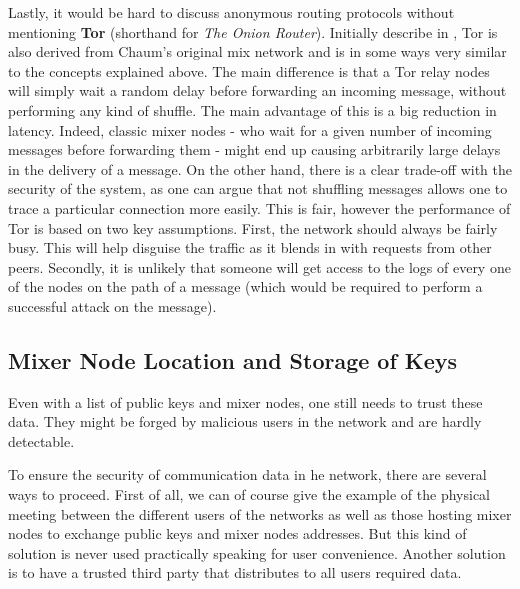 \documentclass[11pt, a4paper]{article}
\begin{document}
        \bigbreak
        Lastly, it would be hard to discuss anonymous routing protocols without mentioning \textbf{Tor} (shorthand for \textit{The Onion Router}).
        Initially describe in \cite{tor}, Tor is also derived from Chaum's original mix network and is in some ways very similar to the concepts explained above.
        The main difference is that a Tor relay nodes will simply wait a random delay before forwarding an incoming message, without performing any kind of shuffle.
        The main advantage of this is a big reduction in latency.
        Indeed, classic mixer nodes - who wait for a given number of incoming messages before forwarding them - might end up causing arbitrarily large delays in the delivery of a message.
        On the other hand, there is a clear trade-off with the security of the system, as one can argue that not shuffling messages allows one to trace a particular connection more easily.
        This is fair, however the performance of Tor is based on two key assumptions.
        First, the network should always be fairly busy.
        This will help disguise the traffic as it blends in with requests from other peers.
        Secondly, it is unlikely that someone will get access to the logs of every one of the nodes on the path of a message (which would be required to perform a successful attack on the message).



        \subsection{Mixer Node Location and Storage of Keys}

        Even with a list of public keys and mixer nodes, one still needs to trust these data.
        They might be forged by malicious users in the network and are hardly detectable.

        To ensure the security of communication data in he network, there are several ways to proceed.
        First of all, we can of course give the example of the physical meeting between the different users of the networks as well as those hosting mixer nodes to exchange public keys and mixer nodes addresses.
        But this kind of solution is never used practically speaking for user convenience.
        Another solution is to have a trusted third party that distributes to all users required data.
\end{document}

